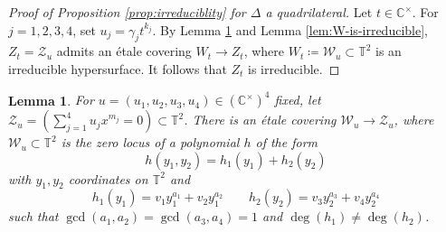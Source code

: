 \documentclass[11pt, reqno]{amsart}
\theoremstyle{plain}
\newtheorem{lem}[thm]{Lemma}
\theoremstyle{definition}
\newcommand{\CC}{\mathbb{C}}
\newcommand{\TT}{\mathbb{T}}
\begin{document}
\begin{proof}[Proof of Proposition \ref{prop:irreduciblity} for $\Delta$ a quadrilateral]
Let $t \in \CC^\times$. For $j=1,2,3,4$, set $u_j=\gamma_j t^{k_j}$. By Lemma \ref{lem:Z-is-covered} and Lemma \ref{lem:W-is-irreducible}, $Z_t=\mathcal{Z}_u$ admits an étale covering $W_t \to Z_t$, where $W_t \coloneqq \mathcal{W}_u \subset \TT^2$ is an irreducible hypersurface. It follows that $Z_t$ is irreducible.
\end{proof}

\begin{lem}\label{lem:Z-is-covered}
For $u=(u_1, u_2, u_3,u_4)\in (\CC^\times)^4$ fixed, let $\mathcal{Z}_u=(\sum_{j=1}^4 u_j x^{m_j}=0) \subset \TT^2$. 
There is an étale covering $\mathcal{W}_u \to \mathcal{Z}_{u}$, where $\mathcal{W}_u \subset \TT^2$ is the zero locus of a polynomial $h$ of the form \[h(y_1,y_2)=h_1(y_1)+h_2(y_2)
\]with $y_1,y_2$ coordinates on $\TT^2$ and
\[
h_1(y_1)= v_1 y_1^{a_1}+v_2y_1^{a_2} \qquad h_2(y_2)=v_3y_2^{a_3}+v_4y_2^{a_4} 
\]
such that $\gcd(a_1,a_2)=\gcd(a_3,a_4)=1$ and $\deg(h_1) \neq \deg(h_2)$.
\end{lem}
\end{document}
